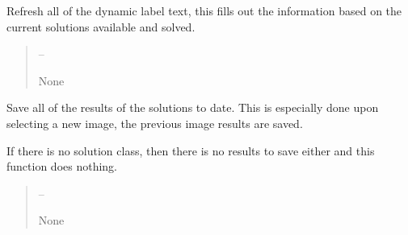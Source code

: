\documentclass[letterpaper,11pt,english]{sphinxmanual}
\begin{document}
\begin{savenotes}
\begin{fulllineitems}
\begin{savenotes}\begin{fulllineitems}
\label{\detokenize{code/opihiexarata.gui.manual:opihiexarata.gui.manual.OpihiManualWindow.refresh_dynamic_label_text}}
\pysigstartsignatures
{}
\pysigstopsignatures
\sphinxAtStartPar
Refresh all of the dynamic label text, this fills out the
information based on the current solutions available and solved.
\begin{quote}\begin{description}
\sphinxAtStartPar
{} – 

\sphinxAtStartPar
None

\end{description}\end{quote}

\end{fulllineitems}\end{savenotes}


\begin{savenotes}\begin{fulllineitems}
\label{\detokenize{code/opihiexarata.gui.manual:opihiexarata.gui.manual.OpihiManualWindow.save_all_results}}
\pysigstartsignatures
{}
\pysigstopsignatures
\sphinxAtStartPar
Save all of the results of the solutions to date. This is especially
done upon selecting a new image, the previous image results are
saved.

\sphinxAtStartPar
If there is no solution class, then there is no results to save either
and this function does nothing.
\begin{quote}\begin{description}
\sphinxAtStartPar
{} – 

\sphinxAtStartPar
None

\end{description}\end{quote}


\end{fulllineitems}
\end{savenotes}
\end{fulllineitems}
\end{savenotes}
\end{document}
